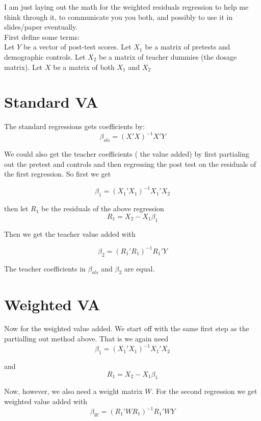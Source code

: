 \documentclass[letterpaper,12pt]{article}
\begin{document}
I am just laying out the math for the weighted residuals regression to help me think through it, to communicate you you both, and possibly to use it in slides/paper eventually. 
\\

First define some terms: 
\\

Let $Y$ be a vector of post-test scores. Let $X_1$ be a matrix of pretests and demographic controls. Let $X_2$ be a matrix of teacher dummies (the dosage matrix). Let $X$ be a matrix of both $X_1$ and $X_2$
\\

\section{Standard VA}
The standard regressions gets coefficients by: 
$$\beta_{ols} = (X'X)^{-1}X'Y $$

We could also get the teacher coefficients ( the value added) by first partialing out the pretest and controls and then regressing the post test on the residuals of the first regression. So first we get 

$$\beta_1 = (X_1'X_1)^{-1}X_1'X_2 $$

then let $R_1$ be the residuals of the above regression 
$$ R_1 = X_2 - X_1 \beta_1$$

Then we get the teacher value added with 

$$ \beta_2 = (R_1'R_1)^{-1}R_1'Y $$

The teacher coefficients in $\beta_{ols}$ and $\beta_2$ are equal.

\section{Weighted VA}

Now for the weighted value added. We start off with the same first step as the partialling out method above. That is we again need 
$$\beta_1 = (X_1'X_1)^{-1}X_1'X_2 $$

and
$$ R_1 = X_2 - X_1 \beta_1$$

Now, however, we also need a weight matrix $W$. For the second regression we get weighted value added with 
$$\beta_{W} = (R_1' W R_1)^{-1}R_1' W Y $$
\end{document}
